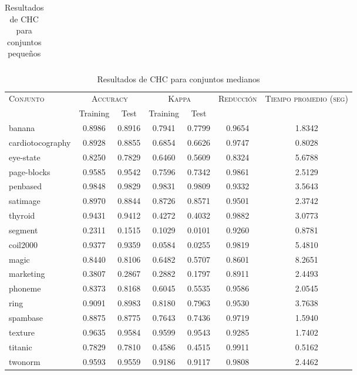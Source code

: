 \begin{table}[]
\begin{tabular}{l c c c c c c}
\hline
\end{tabular}
\caption{Resultados de CHC para conjuntos pequeños }
\label{res-peq-chc}
\end{table}


\begin{table}[]
\centering
\begin{tabular}{l c c c c c c}
\hline
\multirow{2}{*}{\textsc{Conjunto}}
	& \multicolumn{2}{c}{\textsc{Accuracy}}
	& \multicolumn{2}{c}{\textsc{Kappa}}
	& \textsc{Reducción}
	& \textsc{Tiempo promedio (seg)} \\
	& Training & Test
	& Training & Test \\ 
\hline
\hline

banana & 0.8986 & 0.8916 & 0.7941 & 0.7799 & 0.9654 & 1.8342 \\
cardiotocography & 0.8928 & 0.8855 & 0.6854 & 0.6626 & 0.9747 & 0.8028 \\
eye-state & 0.8250 & 0.7829 & 0.6460 & 0.5609 & 0.8324 & 5.6788 \\
page-blocks & 0.9585 & 0.9542 & 0.7596 & 0.7342 & 0.9861 & 2.5129 \\
penbased & 0.9848 & 0.9829 & 0.9831 & 0.9809 & 0.9332 & 3.5643 \\
satimage & 0.8970 & 0.8844 & 0.8726 & 0.8571 & 0.9501 & 2.3742 \\
thyroid & 0.9431 & 0.9412 & 0.4272 & 0.4032 & 0.9882 & 3.0773 \\
segment & 0.2311 & 0.1515 & 0.1029 & 0.0101 & 0.9260 & 0.8781 \\
coil2000 & 0.9377 & 0.9359 & 0.0584 & 0.0255 & 0.9819 & 5.4810 \\
magic & 0.8440 & 0.8106 & 0.6482 & 0.5707 & 0.8601 & 8.2651 \\
marketing & 0.3807 & 0.2867 & 0.2882 & 0.1797 & 0.8911 & 2.4493 \\
phoneme & 0.8373 & 0.8168 & 0.6045 & 0.5535 & 0.9586 & 2.0545 \\
ring & 0.9091 & 0.8983 & 0.8180 & 0.7963 & 0.9530 & 3.7638 \\
spambase & 0.8875 & 0.8775 & 0.7643 & 0.7436 & 0.9719 & 1.5940 \\
texture & 0.9635 & 0.9584 & 0.9599 & 0.9543 & 0.9285 & 1.7402 \\
titanic & 0.7829 & 0.7810 & 0.4586 & 0.4515 & 0.9911 & 0.5162 \\
twonorm & 0.9593 & 0.9559 & 0.9186 & 0.9117 & 0.9808 & 2.4462 \\

\hline
\end{tabular}
\caption{Resultados de CHC para conjuntos medianos }
\label{res-med-chc}
\end{table}


